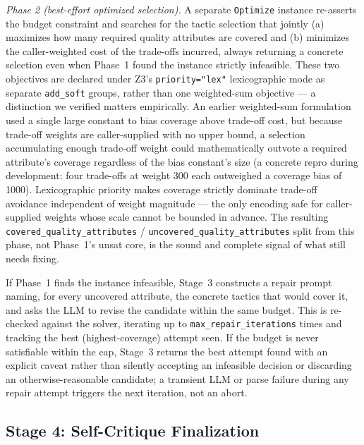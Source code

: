 \documentclass[lettersize,journal]{IEEEtran}
\begin{document}
\emph{Phase 2 (best-effort optimized selection).} A separate \texttt{Optimize} instance re-asserts the budget constraint and searches for the tactic selection that jointly (a) maximizes how many required quality attributes are covered and (b) minimizes the caller-weighted cost of the trade-offs incurred, always returning a concrete selection even when Phase~1 found the instance strictly infeasible. These two objectives are declared under Z3's \texttt{priority="lex"} lexicographic mode as separate \texttt{add\_soft} groups, rather than one weighted-sum objective --- a distinction we verified matters empirically. An earlier weighted-sum formulation used a single large constant to bias coverage above trade-off cost, but because trade-off weights are caller-supplied with no upper bound, a selection accumulating enough trade-off weight could mathematically outvote a required attribute's coverage regardless of the bias constant's size (a concrete repro during development: four trade-offs at weight 300 each outweighed a coverage bias of 1000). Lexicographic priority makes coverage strictly dominate trade-off avoidance independent of weight magnitude --- the only encoding safe for caller-supplied weights whose scale cannot be bounded in advance. The resulting \texttt{covered\_quality\_attributes} / \texttt{uncovered\_quality\_attributes} split from this phase, not Phase~1's unsat core, is the sound and complete signal of what still needs fixing.

If Phase~1 finds the instance infeasible, Stage~3 constructs a repair prompt naming, for every uncovered attribute, the concrete tactics that would cover it, and asks the LLM to revise the candidate within the same budget. This is re-checked against the solver, iterating up to \texttt{max\_repair\_iterations} times and tracking the best (highest-coverage) attempt seen. If the budget is never satisfiable within the cap, Stage~3 returns the best attempt found with an explicit caveat rather than silently accepting an infeasible decision or discarding an otherwise-reasonable candidate; a transient LLM or parse failure during any repair attempt triggers the next iteration, not an abort.

\subsection{Stage 4: Self-Critique Finalization}
\label{sec:method-stage4}
\end{document}
